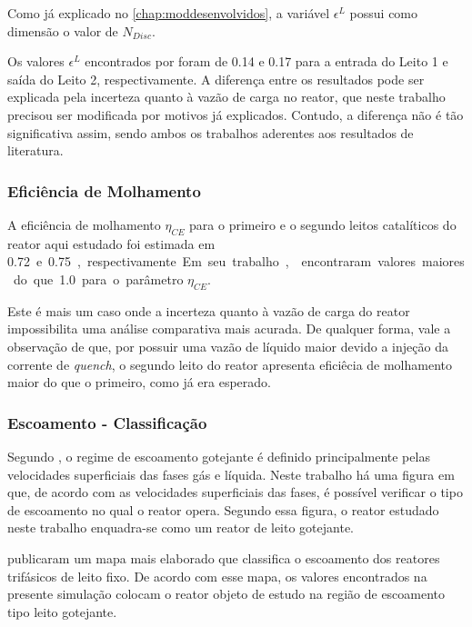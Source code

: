 Como já explicado no \autoref{chap:moddesenvolvidos}, a variável $\epsilon^{L}$
possui como dimensão o valor de $N_{Disc}$.

Os valores $\epsilon^{L}$ encontrados por  foram de
\num{0,14} e \num{0,17} para a entrada do Leito 1 e saída do Leito 2,
respectivamente. A diferença entre os resultados pode ser explicada pela
incerteza quanto à vazão de carga no reator, que neste trabalho precisou ser
modificada por motivos já explicados. Contudo, a diferença não é tão
significativa assim, sendo ambos os trabalhos aderentes aos resultados de
literatura.

\subsubsection{Eficiência de Molhamento} \label{eficienciademolhamento}

A eficiência de molhamento $\eta_{CE}$ para o primeiro e o segundo leitos
catalíticos do reator aqui estudado foi estimada em \SI{0,72} e \SI{0,75},
respectivamente. Em seu trabalho,  encontraram valores
maiores do que \SI{1,0} para o parâmetro $\eta_{CE}$.

Este é mais um caso onde a incerteza quanto à vazão de carga do reator
impossibilita uma análise comparativa mais acurada. De qualquer forma, vale a
observação de que, por possuir uma vazão de líquido maior devido a injeção da
corrente de \emph{quench}, o segundo leito do reator apresenta eficiêcia de
molhamento maior do que o primeiro, como já era esperado.

\subsubsection{Escoamento - Classificação} \label{escoamentoclassificacao}

Segundo , o regime de escoamento gotejante é definido
principalmente pelas velocidades superficiais das fases gás e líquida. Neste
trabalho há uma figura em que, de acordo com as velocidades superficiais das
fases, é possível verificar o tipo de escoamento no qual o reator opera. Segundo
essa figura, o reator estudado neste trabalho enquadra-se como um reator de
leito gotejante.

 publicaram um mapa mais elaborado que classifica o
escoamento dos reatores trifásicos de leito fixo. De acordo com esse mapa, os
valores encontrados na presente simulação colocam o reator objeto de estudo na
região de escoamento tipo leito gotejante.


